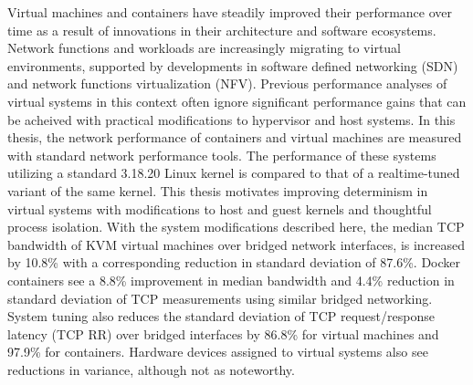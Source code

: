 Virtual machines and containers have steadily improved their performance over time as a result of innovations in their architecture and software ecosystems.
Network functions and workloads are increasingly migrating to virtual environments, supported by developments in software defined networking (SDN) and network functions virtualization (NFV).
Previous performance analyses of virtual systems in this context often ignore significant performance gains that can be acheived with practical modifications to hypervisor and host systems.
In this thesis, the network performance of containers and virtual machines are measured with standard network performance tools.
The performance of these systems utilizing a standard 3.18.20 Linux kernel is compared to that of a realtime-tuned variant of the same kernel.  
This thesis motivates improving determinism in virtual systems with modifications to host and guest kernels and thoughtful process isolation. 
With the system modifications described here, the median TCP bandwidth of KVM virtual machines over bridged network interfaces, is increased by 10.8\% with a corresponding reduction in standard deviation of 87.6\%.
Docker containers see a 8.8\% improvement in median bandwidth and 4.4\% reduction in standard deviation of TCP measurements using similar bridged networking.
System tuning also reduces the standard deviation of TCP request/response latency (TCP RR) over bridged interfaces by 86.8\% for virtual machines and 97.9\% for containers.
Hardware devices assigned to virtual systems also see reductions in variance, although not as noteworthy.


